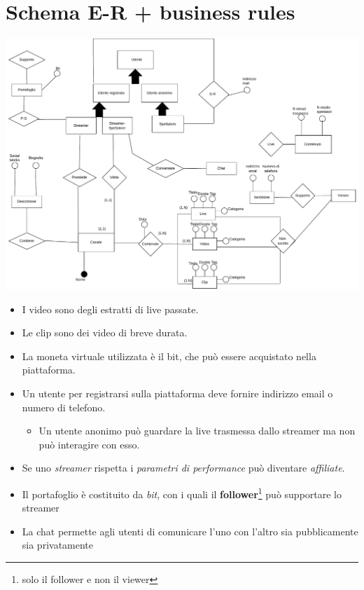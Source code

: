 \section{Schema E-R + business rules }
\includegraphics[width=\textwidth]{resources/schema_e-r.pdf}
\begin{itemize}
    \item I video sono degli estratti di live passate.
    \item Le clip sono dei video di breve durata.
    \item La moneta virtuale utilizzata è il bit, che può essere acquistato nella piattaforma.
    \item Un utente per registrarsi sulla piattaforma deve fornire indirizzo email o numero di telefono.
    \begin{itemize}
        \item Un utente anonimo può guardare la live trasmessa dallo streamer ma non può interagire con esso. 
    \end{itemize}
        \item Se uno \textit{streamer} rispetta i \textit{parametri di performance} può diventare \textit{affiliate}.
        \item Il portafoglio è costituito da \textit{bit}, con i quali il \textbf{follower}\footnote{solo il follower e non il viewer} può supportare lo streamer
        \item La chat permette agli utenti di comunicare l'uno con l'altro sia pubblicamente sia privatamente
\end{itemize}